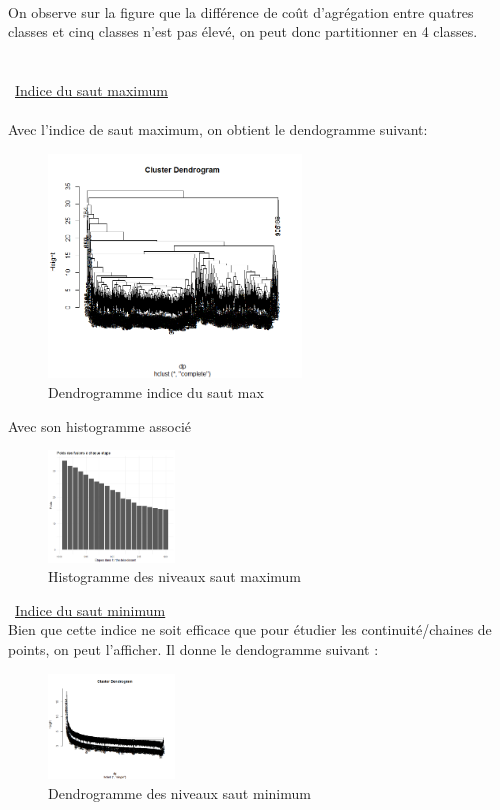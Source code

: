 \documentclass{article}
\begin{document}
\\
On observe sur la figure que la différence de coût d'agrégation entre quatres classes et cinq classes n'est pas élevé, on peut donc partitionner en 4 classes.
\\
\\
\\
\textbullet\ \underline{Indice du saut maximum}
\\
\\
Avec l'indice de saut maximum, on obtient le dendogramme suivant:
\\
\begin{figure}[H]
    \centering
    \includegraphics[width=0.6\textwidth]{dendromax4.png}
    \caption{Dendrogramme  indice du saut max}
    \label{fig:dendmax} 
\end{figure}
Avec son histogramme associé
\\
\begin{figure}[H]
    \centering
    \includegraphics[width=0.3\textwidth]{histomax4.png}
    \caption{Histogramme des niveaux saut maximum}
    \label{fig:histomax} 
\end{figure}

\textbullet\ \underline{Indice du saut minimum}
\\
Bien que cette indice ne soit efficace que pour étudier les continuité/chaines de points,
 on peut l'afficher. Il donne le dendogramme suivant : 
\\
\begin{figure}[H]
    \centering
    \includegraphics[width=0.3\textwidth]{dendrogrammin.png}
    \caption{Dendrogramme des niveaux saut minimum}
    \label{fig:dendromin} 
\end{figure}
\end{document}

